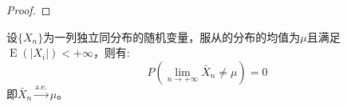 \begin{proof}
\end{proof}

\begin{theorem}
	\label{theo:StrongLawOfLargeNumbers}
	设$\{X_n\}$为一列独立同分布的随机变量，服从的分布的均值为$\mu$且满足$\operatorname{E}(|X_i|)<+\infty$，则有:
	\begin{equation*}
		P\left(\lim_{n\to+\infty}\bar{X}_n\ne\mu\right)=0
	\end{equation*}
	即$\bar{X}_n\overset{\text{a.e.}}{\longrightarrow}\mu$。
\end{theorem}
